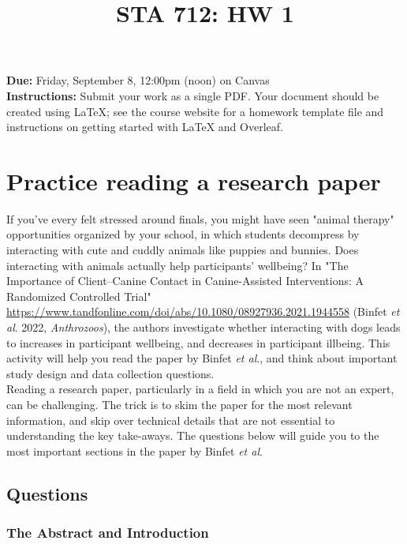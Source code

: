 \documentclass[12pt]{article}
\title{STA 712: HW 1}
\author{}
\date{}
\begin{document}
\maketitle

\noindent \textbf{Due:} Friday, September 8, 12:00pm (noon) on Canvas\\

\noindent \textbf{Instructions:} Submit your work as a single PDF. Your document should be created using LaTeX; see the course website for a homework template file and instructions on getting started with LaTeX and Overleaf.

\section{Practice reading a research paper}

If you've every felt stressed around finals, you might have seen "animal therapy" opportunities organized by your school, in which students decompress by interacting with cute and cuddly animals like puppies and bunnies. Does interacting with animals actually help participants' wellbeing? In "The Importance of Client–Canine Contact in Canine-Assisted Interventions: A Randomized Controlled Trial" \url{https://www.tandfonline.com/doi/abs/10.1080/08927936.2021.1944558} (Binfet \textit{et al}. 2022, \textit{Anthrozoos}), the authors investigate whether interacting with dogs leads to increases in participant wellbeing, and decreases in participant illbeing. This activity will help you read the paper by Binfet \textit{et al}., and think about important study design and data collection questions.\\

\noindent Reading a research paper, particularly in a field in which you are not an expert, can be challenging. The trick is to skim the paper for the most relevant information, and skip over technical details that are not essential to understanding the key take-aways. The questions below will guide you to the most important sections in the paper by Binfet \textit{et al}.

\subsection*{Questions}

\subsubsection*{The Abstract and Introduction}
\end{document}
